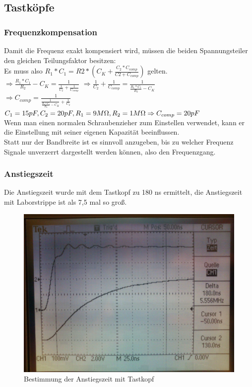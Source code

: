 \subsection{Tastköpfe}
\subsubsection*{Frequenzkompensation}
Damit die Frequenz exakt kompensiert wird, müssen die beiden Spannungsteiler den gleichen Teilungsfaktor besitzen:\\
Es muss also $R_1 * C_1 = R2 * (C_K + \frac{C_2*C_{comp}}{C2+C_{comp}})$ gelten.\\
$\Rightarrow \frac{R_1*C_1}{R_2}-C_K=\frac{1}{\frac{1}{C_2}+\frac{1}{C_{comp}}}$
$\Rightarrow \frac{1}{C_2}+\frac{1}{C_{comp}}=\frac{1}{\frac{R_1*C_1}{R_2}-C_K}$\\
$\Rightarrow C_{comp}=\frac{1}{\frac{1}{\frac{R_1*C_1}{R_2}-C_K}+\frac{1}{C_2}}$
$ C_1=15pF, C_2=20pF, R_1=9M\Omega, R_2=1M\Omega \Rightarrow C_{comp} = 20pF$\\
Wenn man einen normalen Schraubenzieher zum Einstellen verwendet, kann er die Einstellung mit seiner eigenen Kapazität beeinflussen.\\
Statt nur der Bandbreite ist es sinnvoll anzugeben, bis zu welcher Frequenz Signale unverzerrt dargestellt werden können, also den Frequenzgang.
\subsubsection{Anstiegszeit}
Die Anstiegszeit wurde mit dem Tastkopf zu 180 ns ermittelt, die Anstiegszeit mit Laborstrippe ist als 7,5 mal so groß.
\begin{figure}[H]
	\centering
	\includegraphics[width=\linewidth]{versuch4/oszi/DSC_0335.JPG}
	\caption{Bestimmung der Anstiegszeit mit Tastkopf}
\end{figure}

